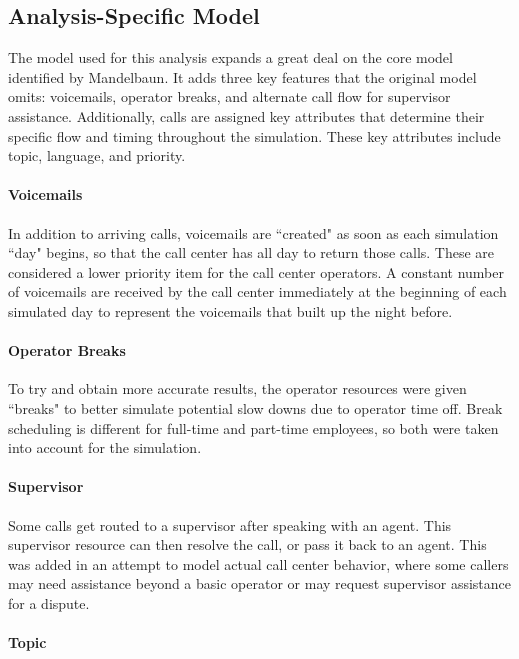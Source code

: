\documentclass[12pt,twocolumn]{article}
\begin{document}
\subsection{Analysis-Specific Model}
The model used for this analysis expands a great deal on the core model identified by Mandelbaun.  It adds three key features that the original model omits: voicemails, operator breaks, and alternate call flow for supervisor assistance.  Additionally, calls are assigned key attributes that determine their specific flow and timing throughout the simulation.  These key attributes include topic, language, and priority.

	\paragraph{Voicemails}
	
In addition to arriving calls, voicemails are ``created" as soon as each simulation ``day" begins, so that the call center has all day to return those calls.  These are considered a lower priority item for the call center operators.  A constant number of voicemails are received by the call center immediately at the beginning of each simulated day to represent the voicemails that built up the night before.

	\paragraph{Operator Breaks}
	
To try and obtain more accurate results, the operator resources were given ``breaks" to better simulate potential slow downs due to operator time off. Break scheduling is different for full-time and part-time employees, so both were taken into account for the simulation.

	\paragraph{Supervisor}
	
Some calls get routed to a supervisor after speaking with an agent.  This supervisor resource can then resolve the call, or pass it back to an agent.  This was added in an attempt to model actual call center behavior, where some callers may need assistance beyond a basic operator or may request supervisor assistance for a dispute. 

	\paragraph{Topic}
\end{document}
